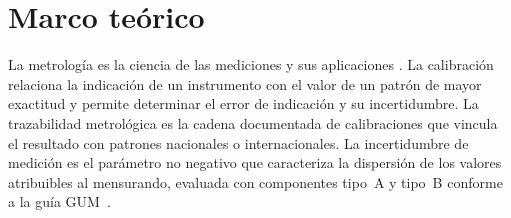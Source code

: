 \section{Marco teórico}

\noindent La metrología es la ciencia de las mediciones y sus aplicaciones
\parencite{jcgm_200_2012_vim}. La calibración relaciona la indicación de un
instrumento con el valor de un patrón de mayor exactitud y permite determinar el
error de indicación y su incertidumbre. La trazabilidad metrológica es la cadena
documentada de calibraciones que vincula el resultado con patrones nacionales o
internacionales. La incertidumbre de medición es el parámetro no negativo que
caracteriza la dispersión de los valores atribuibles al mensurando, evaluada con
componentes tipo~A y tipo~B conforme a la guía GUM~\parencite{jcgm2008gum}.











